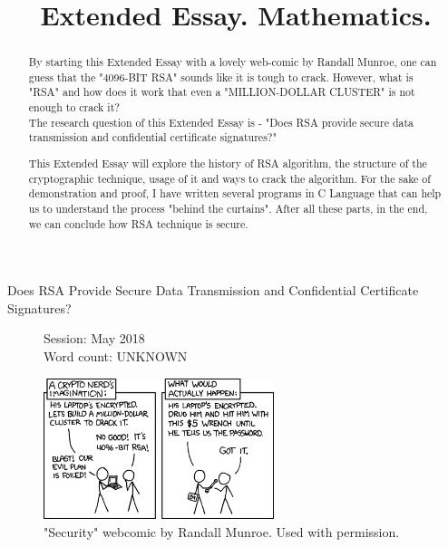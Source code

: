 \documentclass[a4paper, 12pt]{article}
\title{Extended Essay. Mathematics.}
\date{}
\begin{document}

\maketitle

\begin{center}
Does RSA Provide Secure Data Transmission and Confidential Certificate Signatures?
\end{center}

\begin{flushleft}
\begin{figure}[b]
  Session: May 2018\\
  Word count: UNKNOWN\\
\end{figure}
\end{flushleft}

\newpage


\tableofcontents
\newpage
\listoffigures
\listoftables
\lstlistoflistings


\newpage
{}

\begin{figure}[h!]
  \begin{center}
    \includegraphics[width=0.6\textwidth]{xkcd_security.png}
    \caption{"Security" webcomic by Randall Munroe. Used with permission.\cite{xkcd}}
    \label{fig:xkcd}
    \end{center}
  \end{figure}

\begin{abstract}
\label{sec:abstract}

By starting this Extended Essay with a lovely web-comic by Randall Munroe, one can guess that the "4096-BIT RSA" sounds like it is tough to crack.
However, what is "RSA" and how does it work that even a "MILLION-DOLLAR CLUSTER" is not enough to crack it?\\
The research question of this Extended Essay is - "Does RSA provide secure data transmission
and confidential certificate signatures?"

This Extended Essay will explore the history of RSA
algorithm, the structure of the cryptographic technique, usage of it and ways to crack the algorithm.
For the sake of demonstration and proof, I have written several programs in C Language\cite{Clang} that can help us to understand the process "behind the curtains". After all these parts, in the end, we can conclude how RSA technique is secure.
\end{abstract}
\end{document}
